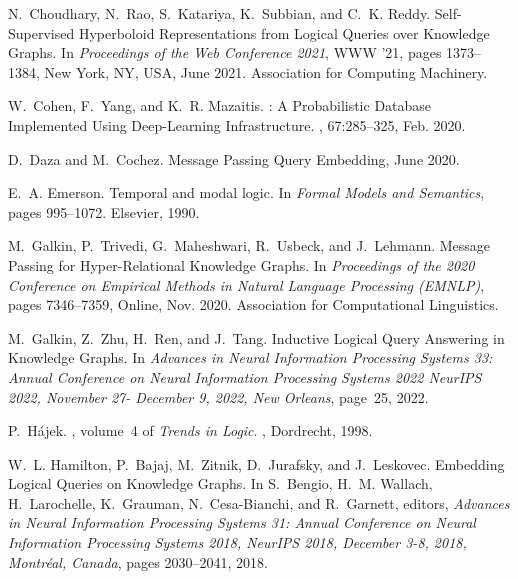\documentclass[11pt]{article}
\begin{document}
\begin{thebibliography}{10}
\begin{small}
N.~Choudhary, N.~Rao, S.~Katariya, K.~Subbian, and C.~K. Reddy.
\newblock Self-{{Supervised Hyperboloid Representations}} from {{Logical
		Queries}} over {{Knowledge Graphs}}.
\newblock In {\em Proceedings of the {{Web Conference}} 2021}, {{WWW}} '21,
pages 1373--1384, {New York, NY, USA}, June 2021. {Association for Computing
	Machinery}.

W.~Cohen, F.~Yang, and K.~R. Mazaitis.
: {{A Probabilistic Database Implemented Using
		Deep-Learning Infrastructure}}.
, 67:285--325, Feb.
2020.

D.~Daza and M.~Cochez.
\newblock Message {{Passing Query Embedding}}, June 2020.

E.~A. Emerson.
\newblock Temporal and modal logic.
\newblock In {\em Formal Models and Semantics}, pages 995--1072. Elsevier,
1990.

M.~Galkin, P.~Trivedi, G.~Maheshwari, R.~Usbeck, and J.~Lehmann.
\newblock Message {{Passing}} for {{Hyper-Relational Knowledge Graphs}}.
\newblock In {\em Proceedings of the 2020 {{Conference}} on {{Empirical
			Methods}} in {{Natural Language Processing}} ({{EMNLP}})}, pages 7346--7359,
{Online}, Nov. 2020. {Association for Computational Linguistics}.

M.~Galkin, Z.~Zhu, H.~Ren, and J.~Tang.
\newblock Inductive {{Logical Query Answering}} in {{Knowledge Graphs}}.
\newblock In {\em Advances in {{Neural Information Processing Systems}} 33:
	{{Annual Conference}} on {{Neural Information Processing Systems}} 2022
	{{NeurIPS}} 2022, {{November}} 27- {{December}} 9, 2022, {{New Orleans}}},
page~25, 2022.

P.~H{\'a}jek.
, volume~4 of {\em Trends in
	{{Logic}}}.
, {Dordrecht}, 1998.

W.~L. Hamilton, P.~Bajaj, M.~Zitnik, D.~Jurafsky, and J.~Leskovec.
\newblock Embedding {{Logical Queries}} on {{Knowledge Graphs}}.
\newblock In S.~Bengio, H.~M. Wallach, H.~Larochelle, K.~Grauman,
N.~{Cesa-Bianchi}, and R.~Garnett, editors, {\em Advances in {{Neural
			Information Processing Systems}} 31: {{Annual Conference}} on {{Neural
			Information Processing Systems}} 2018, {{NeurIPS}} 2018, {{December}} 3-8,
	2018, {{Montr\'eal}}, {{Canada}}}, pages 2030--2041, 2018.


\end{small}
\end{thebibliography}
\end{document}
